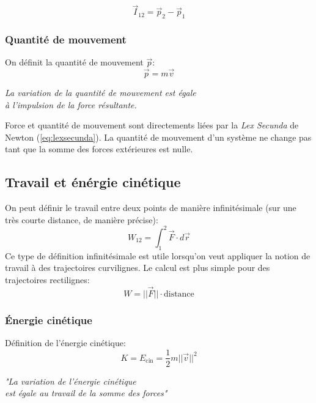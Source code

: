 \documentclass{article}
\numberwithin{equation}{section}
\begin{document}
\begin{equation}
	\boxed{ \vec I_{12} = \vec p_2 - \vec p_1 }
\end{equation}

\subsubsection{Quantité de mouvement}
On définit la quantité de mouvement \(\vec p\):
\begin{equation} \label{eq:defquantitemouvement}
	\boxed{ \vec p = m \vec v }
\end{equation}

\begin{center}
	\emph{La variation de la quantité de mouvement est égale \\ à l'impulsion de la force résultante.}
\end{center}

Force et quantité de mouvement sont directements liées par la \emph{Lex Secunda} de Newton (\ref{eq:lexsecunda}). La quantité de mouvement d'un système ne change pas tant que la somme des forces extérieures est nulle.

\subsection{Travail et énérgie cinétique}

On peut définir le travail entre deux points de manière infinitésimale (sur une très courte distance, de manière précise):
\begin{equation}
	\boxed{ W_{12} = \int_1^2 \vec F \cdot d \vec r }
\end{equation}
Ce type de définition infinitésimale est utile lorsqu'on veut appliquer la notion de travail à des trajectoires curvilignes. Le calcul est plus simple pour des trajectoires rectilignes:
\begin{equation}
	\boxed{ W = ||\vec F|| \cdot \text{distance} }
\end{equation}

\subsubsection{Énergie cinétique}
Définition de l'énergie cinétique:
\begin{equation}
	\boxed{ K = E_\text{cin} = \frac{1}{2} m ||\vec v||^2 }
\end{equation}

\begin{center}
	\emph{"La variation de l'énergie cinétique \\ est égale au travail de la somme des forces"}
\end{center}
\end{document}
